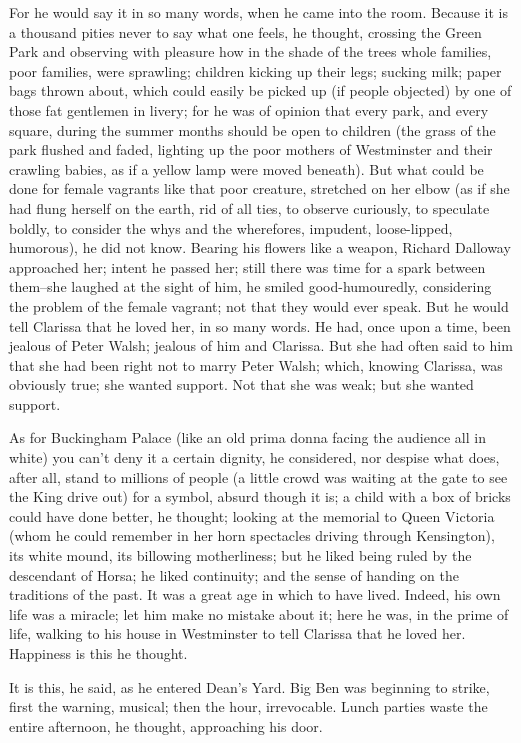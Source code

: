 \documentclass[lang=cn,10pt]{elegantbook}
\begin{document}
For he would say it in so many words, when he came into the room.
Because it is a thousand pities never to say what one feels, he
thought, crossing the Green Park and observing with pleasure how in
the shade of the trees whole families, poor families, were
sprawling; children kicking up their legs; sucking milk; paper bags
thrown about, which could easily be picked up (if people objected)
by one of those fat gentlemen in livery; for he was of opinion that
every park, and every square, during the summer months should be
open to children (the grass of the park flushed and faded, lighting
up the poor mothers of Westminster and their crawling babies, as if
a yellow lamp were moved beneath).  But what could be done for
female vagrants like that poor creature, stretched on her elbow (as
if she had flung herself on the earth, rid of all ties, to observe
curiously, to speculate boldly, to consider the whys and the
wherefores, impudent, loose-lipped, humorous), he did not know.
Bearing his flowers like a weapon, Richard Dalloway approached her;
intent he passed her; still there was time for a spark between
them--she laughed at the sight of him, he smiled good-humouredly,
considering the problem of the female vagrant; not that they would
ever speak.  But he would tell Clarissa that he loved her, in so
many words.  He had, once upon a time, been jealous of Peter Walsh;
jealous of him and Clarissa.  But she had often said to him that
she had been right not to marry Peter Walsh; which, knowing
Clarissa, was obviously true; she wanted support.  Not that she was
weak; but she wanted support.

As for Buckingham Palace (like an old prima donna facing the
audience all in white) you can't deny it a certain dignity, he
considered, nor despise what does, after all, stand to millions of
people (a little crowd was waiting at the gate to see the King
drive out) for a symbol, absurd though it is; a child with a box of
bricks could have done better, he thought; looking at the memorial
to Queen Victoria (whom he could remember in her horn spectacles
driving through Kensington), its white mound, its billowing
motherliness; but he liked being ruled by the descendant of Horsa;
he liked continuity; and the sense of handing on the traditions of
the past.  It was a great age in which to have lived.  Indeed, his
own life was a miracle; let him make no mistake about it; here he
was, in the prime of life, walking to his house in Westminster to
tell Clarissa that he loved her.  Happiness is this he thought.

It is this, he said, as he entered Dean's Yard.  Big Ben was
beginning to strike, first the warning, musical; then the hour,
irrevocable.  Lunch parties waste the entire afternoon, he thought,
approaching his door.
\end{document}
